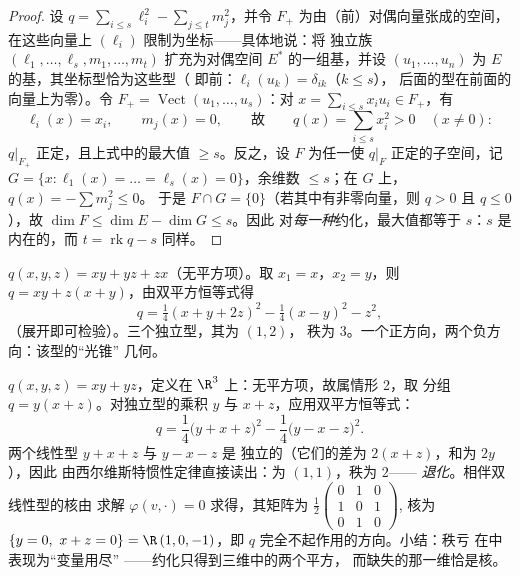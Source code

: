 \begin{proof}
设 $q = \sum_{i \leq s}\ell_i^2 - \sum_{j\leq t} m_j^2$，并令
$F_+$ 为由（前）对偶向量张成的空间，在这些向量上 $(\ell_i)$
限制为坐标——具体地说：将
独立族 $(\ell_1, \dots, \ell_s, m_1, \dots, m_t)$
扩充为对偶空间 $E^*$ 的一组基，并设 $(u_1, \dots, u_n)$ 为
$E$ 的基，其坐标型恰为这些型（
即前：$\ell_i(u_k) = \delta_{ik}$（$k \leq s$），
后面的型在前面的向量上为零）。令 $F_+ =
\operatorname{Vect}(u_1, \dots, u_s)$：对 $x = \sum_{i\leq
s}x_iu_i \in F_+$，有
\[
\ell_i(x) = x_i,
\qquad m_j(x) = 0,
\qquad\text{故}\qquad
q(x) = \sum_{i\leq s}x_i^2 > 0 \quad (x \neq 0) :
\]
$q|_{F_+}$ 正定，且上式中的最大值
$\geq s$。反之，设 $F$ 为任一使 $q|_F$
正定的子空间，记 $G = \{x : \ell_1(x) = \dots = \ell_s(x) =
0\}$，余维数 $\leq s$；在 $G$ 上，$q(x) = -\sum m_j^2 \leq 0$。
于是 $F \cap G = \{0\}$（若其中有非零向量，则 $q > 0$
且 $q \leq 0$），故 $\dim F \leq \dim E - \dim G \leq s$。因此
对\emph{每一种}约化，最大值都等于 $s$：$s$ 是内在的，而 $t
= \operatorname{rk} q - s$ 同样。
\end{proof}

\begin{example}\label{ex:b2:quadratic:gaussexample}
$q(x, y, z) = xy + yz + zx$（无平方项）。取 $x_1 = x$，$x_2 =
y$，则 $q = xy + z(x + y)$，由双平方恒等式得
\[
q = \tfrac14(x + y + 2z)^2 - \tfrac14(x - y)^2 - z^2 ,
\]
（展开即可检验）。三个独立型，其为 $(1, 2)$，
秩为 $3$。一个正方向，两个负方向：该型的“光锥”
几何。
\end{example}

\begin{example}\label{ex:b2:quadratic:degenerate}
$q(x, y, z) = xy + yz$，定义在 $\R^3$ 上：无平方项，故属情形 2，取
分组 $q = y(x + z)$。对独立型的乘积
$y$ 与 $x + z$，应用双平方恒等式：
\[
q = \frac14\bigl(y + x + z\bigr)^2 -
\frac14\bigl(y - x - z\bigr)^2 .
\]
两个线性型 $y + x + z$ 与 $y - x - z$ 是
独立的（它们的差为 $2(x+z)$，和为 $2y$），因此
由西尔维斯特惯性定律直接读出：为 $(1, 1)$，秩为 $2$——
\emph{退化}。相伴双线性型的核由
求解 $\varphi(v, \cdot) = 0$ 求得，其矩阵为
$\frac12\begin{pmatrix} 0&1&0\\ 1&0&1\\ 0&1&0\end{pmatrix}$,
核为 $\{y = 0,\ x + z = 0\} = \R\,(1, 0, -1)$，即
$q$ 完全不起作用的方向。小结：秩亏
在中表现为“变量用尽”
——约化只得到三维中的两个平方，
而缺失的那一维恰是核。
\end{example}


